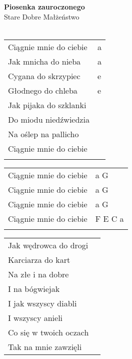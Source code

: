 \documentclass[a5paper]{article}
\begin{document}


\noindent
\fontsize{12pt}{15pt}\selectfont
\textbf{Piosenka zauroczonego} \\
\fontsize{8pt}{10pt}\selectfont
Stare Dobre Małżeństwo \\ \\
\fontsize{10pt}{12pt}\selectfont
{}
\begin{tabular}{@{}p{7.00cm}p{3cm}@{}}
\noindent
Ciągnie mnie do ciebie & a \\
Jak mnicha do nieba & a \\
Cygana do skrzypiec & e \\
Głodnego do chleba & e \\
Jak pijaka do szklanki  \\
Do miodu niedźwiedzia \\
Na oślep na pallicho \\
Ciągnie mnie do ciebie \\ \\
\end{tabular}

\noindent
\begin{tabular}{@{}p{6.00cm}p{3cm}@{}}
Ciągnie mnie do ciebie & a G \\
Ciągnie mnie do ciebie & a G \\
Ciągnie mnie do ciebie & a G \\
Ciągnie mnie do ciebie & F E C a \\ \\
\end{tabular}

\noindent
\begin{tabular}{@{}p{9.00cm}p{3cm}@{}}
Jak wędrowca do drogi \\
Karciarza do kart \\
Na złe i na dobre \\
I na bógwiejak \\
I jak wszyscy diabli \\
I wszyscy anieli \\
Co się w twoich oczach \\
Tak na mnie zawzięli
\end{tabular}
\end{document}
